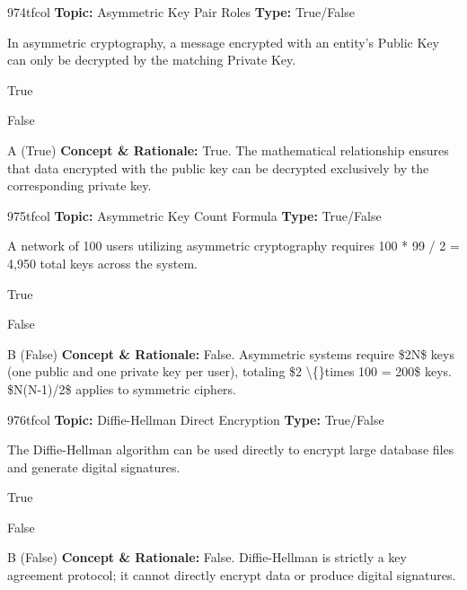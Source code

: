 \begin{qcard}{974}{tfcol}
\textcolor{darkslate!75}{\small\textbf{Topic:} Asymmetric Key Pair Roles \hfill \textbf{Type:} True/False}\vspace{0.4em}\par
In asymmetric cryptography, a message encrypted with an entity's Public Key can only be decrypted by the matching Private Key.
\begin{qoptions}
\item True
\item False
\end{qoptions}
\end{qcard}
\nopagebreak
\begin{explainbox}{A (True)}
\textbf{Concept \& Rationale:} True. The mathematical relationship ensures that data encrypted with the public key can be decrypted exclusively by the corresponding private key.
\end{explainbox}

\begin{qcard}{975}{tfcol}
\textcolor{darkslate!75}{\small\textbf{Topic:} Asymmetric Key Count Formula \hfill \textbf{Type:} True/False}\vspace{0.4em}\par
A network of 100 users utilizing asymmetric cryptography requires 100 * 99 / 2 = 4,950 total keys across the system.
\begin{qoptions}
\item True
\item False
\end{qoptions}
\end{qcard}
\nopagebreak
\begin{explainbox}{B (False)}
\textbf{Concept \& Rationale:} False. Asymmetric systems require \$2N\$ keys (one public and one private key per user), totaling \$2 \textbackslash\{\}times 100 = 200\$ keys. \$N(N-1)/2\$ applies to symmetric ciphers.
\end{explainbox}

\begin{qcard}{976}{tfcol}
\textcolor{darkslate!75}{\small\textbf{Topic:} Diffie-Hellman Direct Encryption \hfill \textbf{Type:} True/False}\vspace{0.4em}\par
The Diffie-Hellman algorithm can be used directly to encrypt large database files and generate digital signatures.
\begin{qoptions}
\item True
\item False
\end{qoptions}
\end{qcard}
\nopagebreak
\begin{explainbox}{B (False)}
\textbf{Concept \& Rationale:} False. Diffie-Hellman is strictly a key agreement protocol; it cannot directly encrypt data or produce digital signatures.
\end{explainbox}

